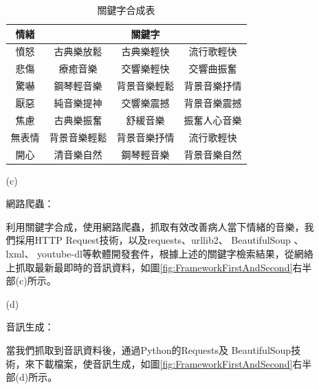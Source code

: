 \documentclass[12pt]{scrreprt}
\begin{document}
\begin{itemize}
\begin{itemize}
\renewcommand{\arraystretch}{1.0} 
\renewcommand{\multirowsetup}{\centering}
\begin{table}[h]
\caption{關鍵字合成表}
    \centering
\begin{tabular}{|*{4}{r|}}
\hline
\multicolumn{1}{|c|}{情緒}
& \multicolumn{3}{c|}{關鍵字} \\\hline
\multicolumn{1}{|c}{憤怒}&\multicolumn{1}{|c}{古典樂放鬆}&\multicolumn{1}{|c}{古典樂輕快}&\multicolumn{1}{|c|}{流行歌輕快} \\\hline
\multicolumn{1}{|c}{悲傷}&\multicolumn{1}{|c}{療癒音樂}&\multicolumn{1}{|c}{交響樂輕快}&\multicolumn{1}{|c|}{交響曲振奮} \\\hline
\multicolumn{1}{|c}{驚嚇}&\multicolumn{1}{|c}{鋼琴輕音樂}&\multicolumn{1}{|c}{背景音樂輕鬆}&\multicolumn{1}{|c|}{背景音樂抒情}\\\hline
\multicolumn{1}{|c}{厭惡}&\multicolumn{1}{|c}{純音樂提神}&\multicolumn{1}{|c}{交響樂震撼}&\multicolumn{1}{|c|}{背景音樂震撼}\\\hline
\multicolumn{1}{|c}{焦慮}&\multicolumn{1}{|c}{古典樂振奮}   &\multicolumn{1}{|c}{舒緩音樂}   &\multicolumn{1}{|c|}{振奮人心音樂}\\\hline
\multicolumn{1}{|c}{無表情}&\multicolumn{1}{|c}{背景音樂輕鬆}   &\multicolumn{1}{|c}{背景音樂抒情}   &\multicolumn{1}{|c|}{流行歌輕快}\\\hline
\multicolumn{1}{|c}{開心}&\multicolumn{1}{|c}{清音樂自然}   &\multicolumn{1}{|c}{鋼琴輕音樂}   &\multicolumn{1}{|c|}{背景音樂自然}\\\hline
\end{tabular}
\label{lab:2}
\end{table}

\item[(c)]{\begin{bfseries}{網路爬蟲：}\end{bfseries}}

利用關鍵字合成，使用網路爬蟲，抓取有效改善病人當下情緒的音樂，我們採用HTTP Request技術，以及requests、urllib2、 BeautifulSoup 、lxml、 youtube-dl等軟體開發套件，根據上述的關鍵字檢索結果，從網絡上抓取最新最即時的音訊資料，如圖\ref{fig:FrameworkFirstAndSecond}右半部(c)所示。\\

\item[(d)]{\begin{bfseries}{音訊生成：}\end{bfseries}}

當我們抓取到音訊資料後，通過Python的Requests及 BeautifulSoup技術，來下載檔案，使音訊生成，如圖\ref{fig:FrameworkFirstAndSecond}右半部(d)所示。\\


\end{itemize}
\end{itemize}
\end{document}
